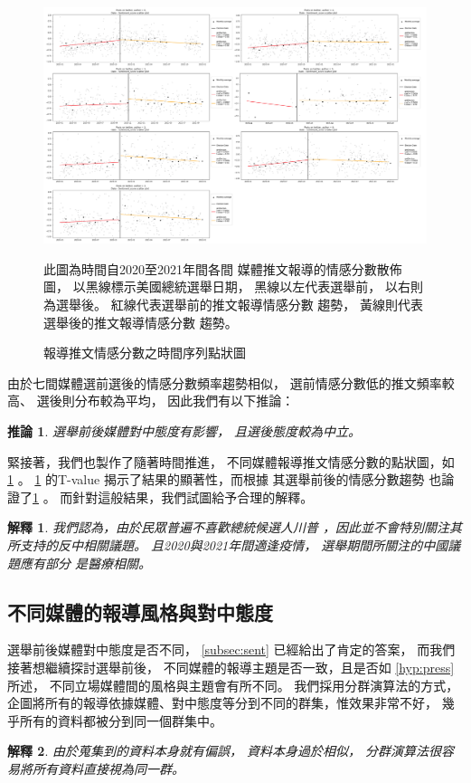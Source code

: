 \documentclass[12pt,twocolumn,letterpaper]{article}
\newtheorem{corollary}{推論}
\newtheorem{explain}{解釋}
\begin{document}
\begin{figure}[htp!]
    \centering
    \begin{minipage}{0.9\textwidth}
    \includegraphics[width=\linewidth]{Figure/scatter.png}
    {\footnotesize 
    此圖為時間自2020至2021年間各間
    媒體推文報導的情感分數散佈圖，
    以黑線標示美國總統選舉日期，
    黑線以左代表選舉前，
    以右則為選舉後。
    紅線代表選舉前的推文報導情感分數
    趨勢，
    黃線則代表選舉後的推文報導情感分數
    趨勢。
    \par}
    \end{minipage}
    \caption{報導推文情感分數之時間序列點狀圖}
    \label{fig:scatter}
\end{figure}

由於七間媒體選前選後的情感分數頻率趨勢相似，
選前情感分數低的推文頻率較高、
選後則分布較為平均，
因此我們有以下推論：



\begin{corollary}\label{cor:attr}
選舉前後媒體對中態度有影響，
且選後態度較為中立。
\end{corollary}

緊接著，我們也製作了隨著時間推進，
不同媒體報導推文情感分數的點狀圖，如
\cref{fig:scatter} 。
\cref{fig:scatter} 的T-value
揭示了結果的顯著性，而根據
其選舉前後的情感分數趨勢
也論證了\cref{cor:attr} 。
而針對這般結果，我們試圖給予合理的解釋。
\begin{explain}\label{exp:attr}
我們認為，由於民眾普遍不喜歡總統候選人川普
，因此並不會特別關注其所支持的反中相關議題。
且2020與2021年間適逢疫情，
選舉期間所關注的中國議題應有部分
是醫療相關。
\end{explain}

\subsection{不同媒體的報導風格與對中態度}\label{subsec:style}
選舉前後媒體對中態度是否不同，
\cref{subsec:sent} 
已經給出了肯定的答案，
而我們接著想繼續探討選舉前後，
不同媒體的報導主題是否一致，且是否如
\cref{hyp:press} 所述，
不同立場媒體間的風格與主題會有所不同。
我們採用分群演算法的方式，
企圖將所有的報導依據媒體、對中態度等分到不同的群集，惟效果非常不好，
幾乎所有的資料都被分到同一個群集中。
\begin{explain}\label{exp:bias}
由於蒐集到的資料本身就有偏誤，
資料本身過於相似，
分群演算法很容易將所有資料直接視為同一群。
\end{explain}
\end{document}
